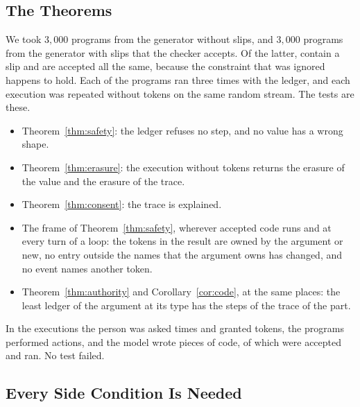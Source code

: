 \documentclass[acmsmall,nonacm,screen]{acmart}
\begin{document}
\subsection{The Theorems}

We took $3{,}000$ programs from the generator without slips, and $3{,}000$ programs from the
generator with slips that the checker accepts. Of the latter, \exLucky{} contain a slip and are
accepted all the same, because the constraint that was ignored happens to hold. Each of the
\exPrograms{} programs ran three times with the ledger, and each execution was repeated
without tokens on the same random stream. The tests are these.
\begin{itemize}
\item Theorem~\ref{thm:safety}: the ledger refuses no step, and no value has a wrong shape.
\item Theorem~\ref{thm:erasure}: the execution without tokens returns the erasure of the value
  and the erasure of the trace.
\item Theorem~\ref{thm:consent}: the trace is explained.
\item The frame of Theorem~\ref{thm:safety}, wherever accepted code runs and at every turn of
  a loop: the tokens in the result are owned by the argument or new, no entry outside the
  names that the argument owns has changed, and no event names another token.
\item Theorem~\ref{thm:authority} and Corollary~\ref{cor:code}, at the same places: the least
  ledger of the argument at its type has the steps of the trace of the part.
\end{itemize}
In the \exRuns{} executions the person was asked \exAsks{} times and granted \exGrants{}
tokens, the programs performed \exActs{} actions, and the model wrote \exWritten{} pieces of
code, of which \exAccepted{} were accepted and ran. No test failed.

\subsection{Every Side Condition Is Needed}
\label{sec:needed}
\end{document}
